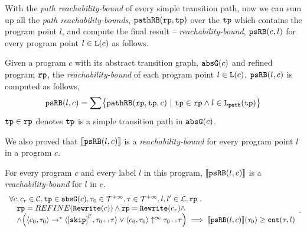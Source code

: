 With the \emph{path reachability-bound} of every simple transition path, now we can sum up all the \emph{path reachability-bounds}, $\mathtt{pathRB}(\mathtt{rp}, \mathtt{tp})$ over the $\mathtt{tp}$ which contains the program point $l$, and compute the final result -- \emph{reachability-bound}, $\mathtt{psRB}(c, l)$ for every program point $l \in \mathtt{L}(c)$ as follows.
%
\begin{defn}
\label{def:point_psrb}
Given a program $c$ with its {abstract transition graph}, $\mathtt{abs}{\mathtt{G}}(c)$ and refined program $\mathtt{rp}$,
the \emph{reachability-bound} of each program point $l \in \mathtt{L}(c)$, $\mathtt{psRB}(l, c)$ is computed as follows,
\[ 
 \psRB(l, c) = 
 \sum
 \left\{ \inoutB(\rprog, \tpath, c) ~\vert~ \tpath \in \rprog \land 
 l \in \pathl(\tpath) \right\}
\]
$\mathtt{tp} \in \mathtt{rp}$ denotes $\mathtt{tp}$ is a simple transition path in $\mathtt{abs}{\mathtt{G}}(c)$.
\end{defn}
We also proved that $\llbracket \mathtt{psRB}(l, c) \rrbracket$ is a \emph{reachability-bound} for every program point $l$ in a program $c$.
\begin{thm}[Soundness]
\label{thm:pathsensitive_rb_soundness}
For every program ${c}$ and every label $l$ in this program,
$\llbracket \mathtt{psRB}(l, c) \rrbracket$ is a \emph{reachability-bound} for $l$ in $c$.
%
{\small
\[
 \begin{array}{l}
 \forall c, c_r \in \cdom, \tpath \in \absG(c), \trace_0 \in \tdom, \trace \in \tdom, l, l' \in \ldom, \rprog \st 
 \\ \quad
 \rprog = REFINE(\algrewrite(c))
 \land 
 \rprog = \algrewrite(c_r)
 \land
 \\ \quad
 \land
 \Big(
 \config{c_0, \trace_0} \rightarrow^* \config{\clabel{\eskip}^{l'}, \trace_0 \tracecat \trace}
 \lor \config{c_0, \trace_0} \uparrow^{\infty} \trace_0 \tracecat \trace 
 \Big)
 \implies \econfig{\psRB(l, c)}(\trace_0) \geq \counter(\trace, l)
 \end{array}.
\]
}
\end{thm}